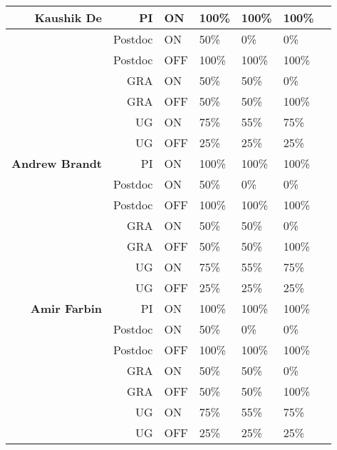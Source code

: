 \begin{table}[htb]
\begin{tabular}{ || r || r |  p{1.7cm} | p{1.7cm} | p{1.7cm} || p{1.7cm} | p{1.8cm} || }
\textbf{Kaushik De}& PI & ON & 100\% & 100\% & 100\% \\ \hline
                                   & Postdoc & ON & 50\% & 0\% & 0\% \\ \hline
                                   & Postdoc & OFF & 100\% & 100\% & 100\% \\ \hline
                                   & GRA & ON & 50\% & 50\% & 0\% \\ \hline
                                   & GRA & OFF & 50\% & 50\% & 100\% \\ \hline
                                   & UG & ON & 75\% & 55\% & 75\% \\ \hline
                                   & UG & OFF & 25\% & 25\% & 25\% \\ \hline\hline\hline
%
\textbf{Andrew Brandt}& PI & ON & 100\% & 100\% & 100\% \\ \hline
                                   & Postdoc & ON & 50\% & 0\% & 0\% \\ \hline
                                   & Postdoc & OFF & 100\% & 100\% & 100\% \\ \hline
                                   & GRA & ON & 50\% & 50\% & 0\% \\ \hline
                                   & GRA & OFF & 50\% & 50\% & 100\% \\ \hline
                                   & UG & ON & 75\% & 55\% & 75\% \\ \hline
                                   & UG & OFF & 25\% & 25\% & 25\% \\ \hline\hline\hline
\textbf{Amir Farbin}& PI & ON & 100\% & 100\% & 100\% \\ \hline
                                   & Postdoc & ON & 50\% & 0\% & 0\% \\ \hline
                                   & Postdoc & OFF & 100\% & 100\% & 100\% \\ \hline
                                   & GRA & ON & 50\% & 50\% & 0\% \\ \hline
                                   & GRA & OFF & 50\% & 50\% & 100\% \\ \hline
                                   & UG & ON & 75\% & 55\% & 75\% \\ \hline
                                   & UG & OFF & 25\% & 25\% & 25\% \\ \hline\hline\hline


\end{tabular}
\end{table}
